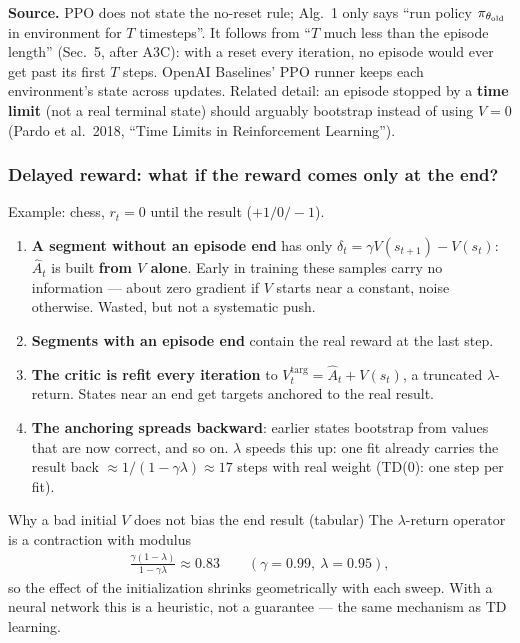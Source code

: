 \begin{notebox}
\textbf{Source.} PPO does not state the no-reset rule; Alg.~1 only says ``run policy $\pi_{\theta_{\mathrm{old}}}$ in environment for $T$ timesteps''. It follows from ``$T$ much less than the episode length'' (Sec.~5, after A3C): with a reset every iteration, no episode would ever get past its first $T$ steps. OpenAI Baselines' PPO runner keeps each environment's state across updates. Related detail: an episode stopped by a \textbf{time limit} (not a real terminal state) should arguably bootstrap instead of using $V=0$ (Pardo et al.\ 2018, ``Time Limits in Reinforcement Learning'').
\end{notebox}

\subsubsection*{Delayed reward: what if the reward comes only at the end?}

Example: chess, $r_t=0$ until the result ($+1/0/-1$).

\begin{enumerate}
  \item \textbf{A segment without an episode end} has only $\delta_t=\gamma V(s_{t+1})-V(s_t)$: $\hat A_t$ is built \textbf{from $V$ alone}. Early in training these samples carry no information --- about zero gradient if $V$ starts near a constant, noise otherwise. Wasted, but not a systematic push.
  \item \textbf{Segments with an episode end} contain the real reward at the last step.
  \item \textbf{The critic is refit every iteration} to $V_t^{\mathrm{targ}}=\hat A_t+V(s_t)$, a truncated $\lambda$-return. States near an end get targets anchored to the real result.
  \item \textbf{The anchoring spreads backward}: earlier states bootstrap from values that are now correct, and so on. $\lambda$ speeds this up: one fit already carries the result back $\approx 1/(1-\gamma\lambda)\approx17$ steps with real weight (TD(0): one step per fit).
\end{enumerate}

\begin{thmbox}{Why a bad initial $V$ does not bias the end result (tabular)}
The $\lambda$-return operator is a contraction with modulus
\begin{gather*}
  \frac{\gamma(1-\lambda)}{1-\gamma\lambda} \approx 0.83 \qquad (\gamma=0.99,\ \lambda=0.95),
\end{gather*}
so the effect of the initialization shrinks geometrically with each sweep. With a neural network this is a heuristic, not a guarantee --- the same mechanism as TD learning.
\end{thmbox}

